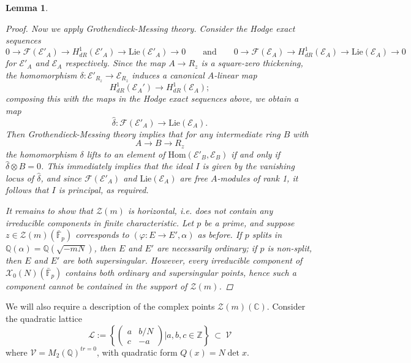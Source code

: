 \documentclass[reqno,oneside]{amsart}
\theoremstyle{plain}
\newtheorem{lemma}[theorem]{Lemma}
\theoremstyle{remark}
\numberwithin{theorem}{section}
\newcommand{\bbC}{\mathbb C}
\newcommand{\bbF}{\mathbb F}
\newcommand{\bbQ}{\mathbb Q}
\newcommand{\bbZ}{\mathbb Z}
\newcommand{\calE}{\mathcal E}
\newcommand{\calF}{\mathcal F}
\newcommand{\calL}{\mathcal L}
\newcommand{\calV}{\mathcal V}
\newcommand{\calX}{\mathcal X}
\newcommand{\calZ}{\mathcal Z}
\newcommand{\Lie}{\mathrm{Lie}}
\newcommand{\Hom}{\mathrm{Hom}}
\begin{document}
\begin{lemma}
\begin{proof}
			Now we apply Grothendieck-Messing theory. Consider the Hodge exact sequences
			\begin{equation}
			0 \to \calF(\calE'_A) \to H^1_{dR}(\calE'_A) \to \Lie(\calE'_A) \to 0 \qquad \text{and} \qquad 					0 \to \calF(\calE_A) \to H^1_{dR}(\calE_A) \to \Lie(\calE_A) \to 0
			\end{equation}
			for $\calE'_A$ and $\calE_A$ respectively.  Since the map $A \to R_z$ is a square-zero thickening, the homomorphism $\delta \colon \calE'_{R_z} \to \calE_{R_z}$ induces a canonical $A$-linear map
			\begin{equation}
			H^1_{dR}(\calE_A') \to H^1_{dR}(\calE_A);
			\end{equation}	
			composing this with the maps in the Hodge exact sequences above, we obtain a map
			\begin{equation}
			\widehat \delta \colon \calF(\calE'_A) \to \Lie(\calE_A).
			\end{equation}
			Then Grothendieck-Messing theory implies that for any intermediate ring $B$ with
			\begin{equation}
			A \to B \to R_z
			\end{equation}
			the homomorphism $\delta $ lifts to an element of $\Hom(\calE'_B , \calE_B)$ if and only if $\widehat \delta \otimes B = 0$. This immediately implies that the ideal $I$ is given by the vanishing locus of $\widehat \delta$, and since $\calF(\calE'_A)$ and $\Lie(\calE_A)$ are free $A$-modules of rank 1, it follows that $I$ is principal, as required.
			
			It remains to show that $\calZ(m)$ is horizontal, i.e. does not contain any irreducible components in finite characteristic. Let $p$ be a prime, and suppose $z \in \calZ(m)(\bar{\bbF}_p)$   corresponds to $(\varphi\colon E \to E', \alpha)$ as before. If $p$ splits in $\bbQ(\alpha) = \bbQ(\sqrt{-mN})$, then $E$ and $E'$ are necessarily ordinary; if $p$ is non-split, then $E$ and $E'$ are both supersingular. However, every irreducible component of $\calX_0(N)(\bar{\bbF}_p)$ contains both ordinary and supersingular points, hence such a component cannot be contained in the support of $\calZ(m)$.
		\end{proof}
	\end{lemma}
	
	We will also require a description of the complex points $\calZ(m)(\bbC)$. Consider the quadratic lattice 	
	\begin{equation} \label{eqn:lattice def}
	\calL := \left\{  \begin{pmatrix} a & b/N \\ c & -a\end{pmatrix} \Big| a,b,c\in \bbZ \right\} \ \subset \ \calV
	\end{equation}
	where $\calV = M_2(\bbQ)^{tr = 0}$, with quadratic form $Q(x) = N \det x$. 	
	
\end{document}
